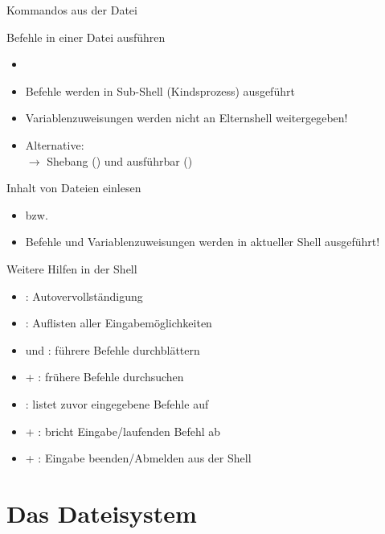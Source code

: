 \documentclass[aspectratio=43]{beamer}
\begin{document}
\begin{frame}{Kommandos aus der Datei}
  \begin{block}{Befehle in einer Datei ausführen}
    \begin{itemize}
      \item {}
      \item Befehle werden in Sub-Shell (Kindsprozess) ausgeführt
      \item Variablenzuweisungen werden nicht an Elternshell weitergegeben!
      \item Alternative: \\
          $\rightarrow$ Shebang () und ausführbar ()
    \end{itemize}
  \end{block}
  \begin{block}{Inhalt von Dateien einlesen}
    \begin{itemize}
      \item {} bzw. 
      \item Befehle und Variablenzuweisungen werden in aktueller Shell ausgeführt!
    \end{itemize}
  \end{block}
\end{frame}

\begin{frame}{Weitere Hilfen in der Shell}
  \begin{itemize}
    \item {}: Autovervollständigung
    \item {}: Auflisten aller Eingabemöglichkeiten
    \item \taste{$\uparrow$} und \taste{$\downarrow$}: führere Befehle durchblättern
    \item {}+ : frühere Befehle durchsuchen
    \item {}: listet zuvor eingegebene Befehle auf
    \item {}+ : bricht Eingabe/laufenden Befehl ab
    \item {}+ : Eingabe beenden/Abmelden aus der Shell
  \end{itemize}

\end{frame}



\section{Das Dateisystem}
\end{document}
